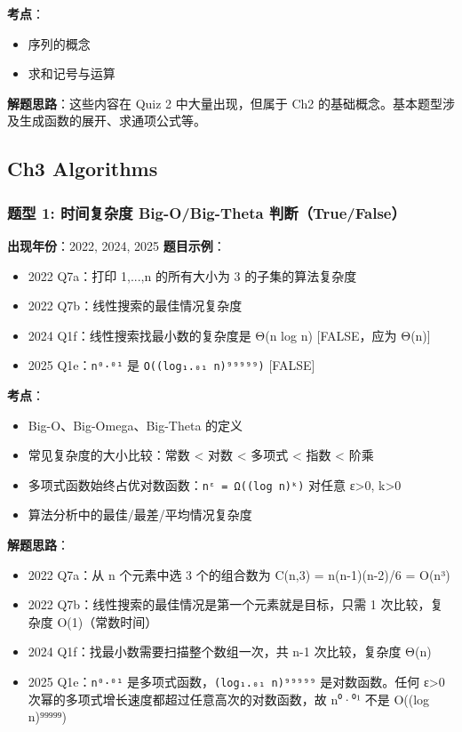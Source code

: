 \documentclass[10pt,a4paper,openany]{ctexbook}
\theoremstyle{definition}
\theoremstyle{remark}
\begin{document}
\textbf{考点}：
\begin{itemize}
\item 序列的概念
\item 求和记号与运算

\end{itemize}

\textbf{解题思路}：这些内容在 Quiz 2 中大量出现，但属于 Ch2 的基础概念。基本题型涉及生成函数的展开、求通项公式等。
\vspace{-2pt}

\subsection{Ch3 Algorithms}

\vspace{-2pt}

\subsubsection{题型 1: 时间复杂度 Big-O/Big-Theta 判断（True/False）}

\textbf{出现年份}：2022, 2024, 2025
\textbf{题目示例}：
\begin{itemize}
\item 2022 Q7a：打印 {1,...,n} 的所有大小为 3 的子集的算法复杂度
\item 2022 Q7b：线性搜索的最佳情况复杂度
\item 2024 Q1f：线性搜索找最小数的复杂度是 Θ(n log n) [FALSE，应为 Θ(n)]
\item 2025 Q1e：\texttt{n⁰·⁰¹} 是 \texttt{O((log₁.₀₁ n)⁹⁹⁹⁹⁹)} [FALSE]

\end{itemize}

\textbf{考点}：
\begin{itemize}
\item Big-O、Big-Omega、Big-Theta 的定义
\item 常见复杂度的大小比较：常数 < 对数 < 多项式 < 指数 < 阶乘
\item 多项式函数始终占优对数函数：\texttt{nᵋ = Ω((log n)ᵏ)} 对任意 ε>0, k>0
\item 算法分析中的最佳/最差/平均情况复杂度

\end{itemize}

\textbf{解题思路}：
\begin{itemize}
\item 2022 Q7a：从 n 个元素中选 3 个的组合数为 C(n,3) = n(n-1)(n-2)/6 = O(n³)
\item 2022 Q7b：线性搜索的最佳情况是第一个元素就是目标，只需 1 次比较，复杂度 O(1)（常数时间）
\item 2024 Q1f：找最小数需要扫描整个数组一次，共 n-1 次比较，复杂度 Θ(n)
\item 2025 Q1e：\texttt{n⁰·⁰¹} 是多项式函数，\texttt{(log₁.₀₁ n)⁹⁹⁹⁹⁹} 是对数函数。任何 ε>0 次幂的多项式增长速度都超过任意高次的对数函数，故 n⁰·⁰¹ 不是 O((log n)⁹⁹⁹⁹⁹)

\end{itemize}
\end{document}
